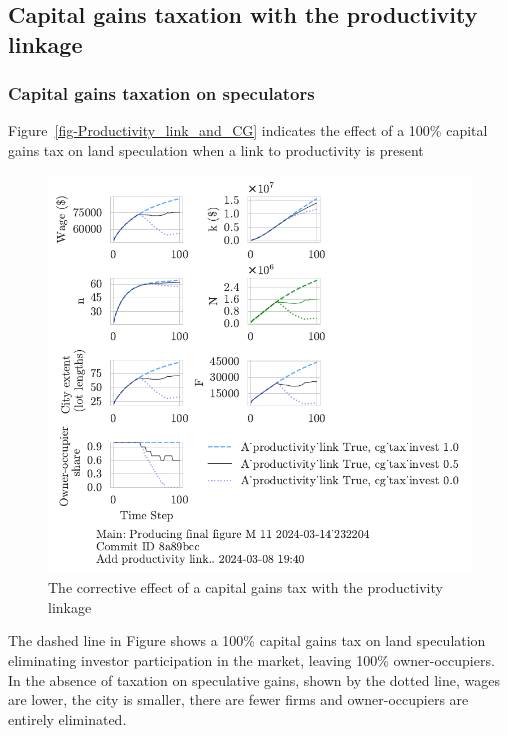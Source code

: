 \subsection{Capital gains taxation with the productivity linkage}
\subsubsection{Capital gains taxation on speculators}
Figure~\ref{fig-Productivity_link_and_CG} indicates the effect of a 100\% capital gains tax on land speculation when a link to productivity is present

\begin{figure}[h!tb]\label{fig-Productivity_link_and_CG}
    \centering
     \includegraphics[scale=1, trim=.25cm 2cm .25cm .25cm, clip]{fig/With-productivity_linkcg_tax_invest-232204.pdf}
    \caption{The corrective effect of a capital gains tax with the productivity linkage}
    \label{fig:Productivity_link_and_CG}
\end{figure}

The dashed line in Figure shows a 100\% capital gains tax on land speculation eliminating investor participation in the market, leaving 100\%  owner-occupiers.  In the absence of taxation on speculative gains, shown by the dotted line, wages are lower, the city is smaller, there are fewer firms and owner-occupiers are entirely eliminated. 


